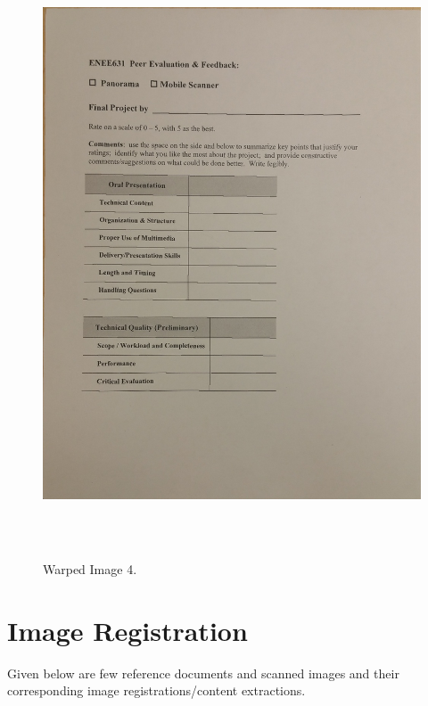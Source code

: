 \begin{figure}[th]
	\centering
	\includegraphics[height=18cm ]{Figures/test_warped_reference_image}
	\caption[Warped Image 4]{Warped Image 4.}
	\label{fig:WarpedImage3}
\end{figure}

\pagebreak


\section{Image Registration}

Given below are few reference documents and scanned images and their corresponding image registrations/content extractions.

